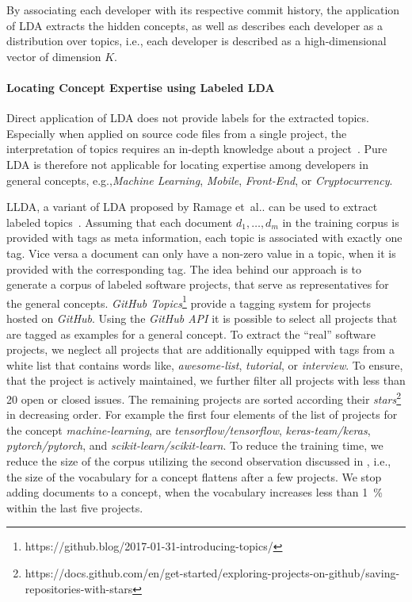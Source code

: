 \documentclass[a4paper,twoside]{article}
\makeatletter
\DeclareRobustCommand\onedot{\futurelet\@let@token\@onedot}
\def\@onedot{\ifx\@let@token.\else.\null\fi\xspace}
\def\etal{et~al\onedot\xspace}
\def\ie{i.e.,\xspace}
\def\eg{e.g.,\xspace}
\makeatother
\begin{document}
By associating each developer with its respective commit history, the application of \ac{LDA} extracts the hidden concepts, as well as describes each developer as a distribution over topics, \ie each developer is described as a high-dimensional vector of dimension $K$.

\paragraph{Locating Concept Expertise using Labeled LDA}
\label{KH:SubSec:LLDA}

Direct application of \ac{LDA} does not provide labels for the extracted topics.
Especially when applied on source code files from a single project, the interpretation of topics requires an in-depth knowledge about a project~\cite{linstead09sourcerer}.
Pure \ac{LDA} is therefore not applicable for locating expertise among developers in general concepts, \eg \textit{Machine Learning}, \textit{Mobile}, \textit{Front-End}, or \textit{Cryptocurrency}.

\ac{LLDA}, a variant of \ac{LDA} proposed by Ramage \etal can be used to extract labeled topics~\cite{ramage2009labeled}.
Assuming that each document $d_1, \dots, d_m$ in the training corpus is provided with tags as meta information, each topic is associated with exactly one tag.
Vice versa a document can only have a non-zero value in a topic, when it is provided with the corresponding tag.
The idea behind our approach is to generate a corpus of labeled software projects, that serve as representatives for the general concepts.
\textit{GitHub Topics}\footnote{https://github.blog/2017-01-31-introducing-topics/} provide a tagging system for projects hosted on \textit{GitHub}.
Using the \textit{GitHub API} it is possible to select all projects that are tagged as examples for a general concept.
To extract the \enquote{real} software projects, we neglect all projects that are additionally equipped with tags from a white list that contains words like, \textit{awesome-list}, \textit{tutorial}, or \textit{interview}.
To ensure, that the project is actively maintained, we further filter all projects with less than 20 open or closed issues.
The remaining projects are sorted according their \textit{stars}\footnote{https://docs.github.com/en/get-started/exploring-projects-on-github/saving-repositories-with-stars} in decreasing order.
For example the first four elements of the list of projects for the concept \textit{machine-learning}, are \textit{tensorflow/tensorflow}, \textit{keras-team/keras}, \textit{pytorch/pytorch}, and \textit{scikit-learn/scikit-learn}.
To reduce the training time, we reduce the size of the corpus utilizing the second observation discussed in , \ie the size of the vocabulary for a concept flattens after a few projects.
We stop adding documents to a concept, when the vocabulary increases less than \SI{1}{\percent} within the last five projects.
\end{document}
